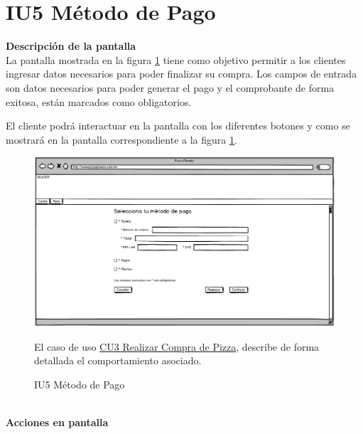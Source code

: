 \hypertarget{IU5}{}
\section{IU5 Método de Pago}

\noindent \textbf{Descripción de la pantalla}\\

La pantalla mostrada en la figura \ref{IU5} tiene como objetivo permitir a los clientes ingresar datos necesarios para poder finalizar su compra.
Los campos de entrada son datos necesarios para poder generar el pago y el comprobante de forma exitosa, están marcados como obligatorios.

El cliente podrá interactuar en la pantalla con los diferentes botones y  como se mostrará en la pantalla correspondiente a la figura \ref{IU5}.

\begin{figure}[h]
	
	\begin{center}				
		
		\includegraphics[scale=0.50]{./imagenes/IUs/RegistroSolicitantes/iu1-IniciarSesion/IU5-MetodoDePago.png}
		\caption{IU5 Método de Pago}
		\label{IU5}
		
	\end{center}
	
	El caso de uso \hyperlink{CU3}{CU3 Realizar Compra de Pizza}, describe de forma detallada el comportamiento asociado.

	
\end{figure}

\pagebreak
	\noindent \textbf{\\Acciones en pantalla}
	

